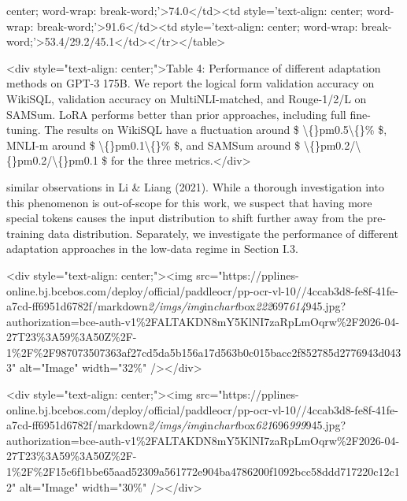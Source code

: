 \documentclass[conference]{IEEEtran}
\begin{document}
center; word-wrap: break-word;'\textgreater{}74.0\textless{}/td\textgreater{}\textless{}td style='text-align: center; word-wrap: break-word;'\textgreater{}91.6\textless{}/td\textgreater{}\textless{}td style='text-align: center; word-wrap: break-word;'\textgreater{}53.4/29.2/45.1\textless{}/td\textgreater{}\textless{}/tr\textgreater{}\textless{}/table\textgreater{}

\textless{}div style="text-align: center;"\textgreater{}Table 4: Performance of different adaptation methods on GPT-3 175B. We report the logical form validation accuracy on WikiSQL, validation accuracy on MultiNLI-matched, and Rouge-1/2/L on SAMSum. LoRA performs better than prior approaches, including full fine-tuning. The results on WikiSQL have a fluctuation around  \$ \textbackslash\{\}pm0.5\textbackslash\{\}\% \$, MNLI-m around  \$ \textbackslash\{\}pm0.1\textbackslash\{\}\% \$, and SAMSum around  \$ \textbackslash\{\}pm0.2/\textbackslash\{\}pm0.2/\textbackslash\{\}pm0.1 \$ for the three metrics.\textless{}/div\textgreater{}

similar observations in Li \& Liang (2021). While a thorough investigation into this phenomenon is out-of-scope for this work, we suspect that having more special tokens causes the input distribution to shift further away from the pre-training data distribution. Separately, we investigate the performance of different adaptation approaches in the low-data regime in Section I.3.

\textless{}div style="text-align: center;"\textgreater{}\textless{}img src="https://pplines-online.bj.bcebos.com/deploy/official/paddleocr/pp-ocr-vl-10//4ccab3d8-fe8f-41fe-a7cd-ff6951d6782f/markdown\textit{2/imgs/img}in\textit{chart}box\textit{222}697\textit{614}945.jpg?authorization=bce-auth-v1\%2FALTAKDN8mY5KlNI7zaRpLmOqrw\%2F2026-04-27T23\%3A59\%3A50Z\%2F-1\%2F\%2F987073507363af27cd5da5b156a17d563b0c015bacc2f852785d2776943d0433" alt="Image" width="32\%" /\textgreater{}\textless{}/div\textgreater{}

\textless{}div style="text-align: center;"\textgreater{}\textless{}img src="https://pplines-online.bj.bcebos.com/deploy/official/paddleocr/pp-ocr-vl-10//4ccab3d8-fe8f-41fe-a7cd-ff6951d6782f/markdown\textit{2/imgs/img}in\textit{chart}box\textit{621}696\textit{999}945.jpg?authorization=bce-auth-v1\%2FALTAKDN8mY5KlNI7zaRpLmOqrw\%2F2026-04-27T23\%3A59\%3A50Z\%2F-1\%2F\%2F15c6f1bbe65aad52309a561772e904ba4786200f1092bcc58ddd717220c12c12" alt="Image" width="30\%" /\textgreater{}\textless{}/div\textgreater{}
\end{document}
